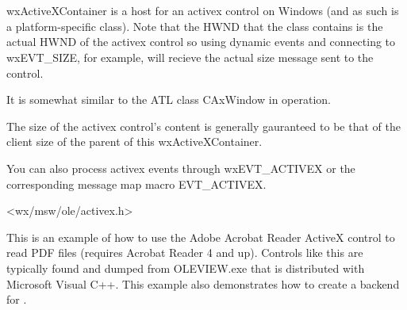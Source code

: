 
\section{}\label{wxactivexcontainer}

wxActiveXContainer is a host for an activex control on Windows (and
as such is a platform-specific class). Note that the HWND that the class
contains is the actual HWND of the activex control so using dynamic events
and connecting to wxEVT\_SIZE, for example, will recieve the actual size
message sent to the control.

It is somewhat similar to the ATL class CAxWindow in operation.

The size of the activex control's content is generally gauranteed to be that
of the client size of the parent of this wxActiveXContainer.

You can also process activex events through wxEVT\_ACTIVEX or the
corresponding message map macro EVT\_ACTIVEX.






<wx/msw/ole/activex.h>


This is an example of how to use the Adobe Acrobat Reader ActiveX control to read PDF files
(requires Acrobat Reader 4 and up). Controls like this are typically found and dumped from
OLEVIEW.exe that is distributed with Microsoft Visual C++. This example also demonstrates
how to create a backend for .

